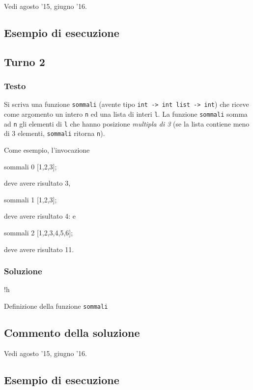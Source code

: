 Vedi agosto '15, giugno '16.

\subsection*{Esempio di esecuzione}

\subsection{Turno 2}

\subsubsection{Testo}

Si scriva una funzione \texttt{sommali} (avente tipo \texttt{int -> int list -> int}) che riceve come argomento un intero \texttt{n} ed una lista di interi \texttt{l}.
La funzione \texttt{sommali} somma ad \texttt{n} gli elementi di \texttt{l} che hanno posizione \emph{multipla di 3} (se la lista contiene meno di 3 elementi, \texttt{sommali} ritorna \texttt{n}).

\medskip
Come esempio, l'invocazione

\begin{smlcode}
sommali 0 [1,2,3];
\end{smlcode}

deve avere risultato 3,

\begin{smlcode}
sommali 1 [1,2,3];
\end{smlcode}

deve avere risultato 4: e

\begin{smlcode}
sommali 2 [1,2,3,4,5,6];
\end{smlcode}

deve avere risultato 11.

\subsubsection{Soluzione}

\begin{listing}{!h}
\caption[funzione sommali -- turno 2]{Definizione della funzione \texttt{sommali}}
\end{listing}

\subsection{Commento della soluzione}

Vedi agosto '15, giugno '16.

\subsection*{Esempio di esecuzione}
